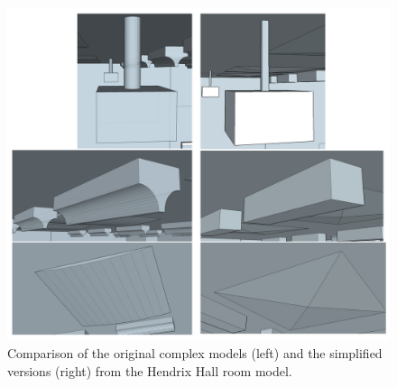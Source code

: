 \documentclass[../../main.tex]{subfiles}
\begin{document}
			\begin{figure}
				\centerline{\includegraphics[width=\textwidth]{Sections/Implementation/Modelling/images/SimplevsComplex/all2.png}}
				\caption{Comparison of the original complex models (left) and the simplified versions (right) from the Hendrix Hall room model.}
				\label{compareModels}
			\end{figure}
			


\end{document}
